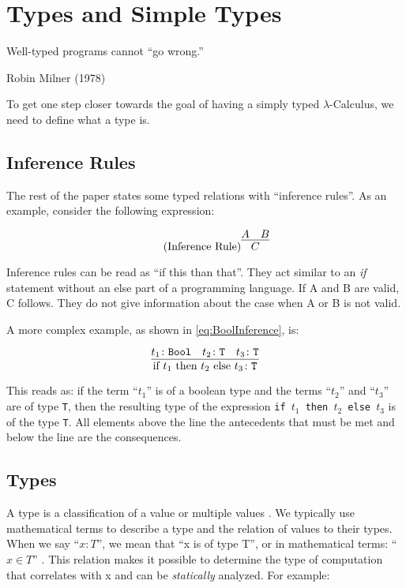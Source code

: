 \section{Types and Simple Types}

\epigraph{Well-typed programs cannot ``go wrong.''}{Robin Milner (1978)}

To get one step closer towards the goal of having a
simply typed $\lambda$-Calculus, we need to define
what a type is.

\subsection{Inference Rules}

The rest of the paper states some typed relations with
``inference rules''. As an example, consider the following
expression:

\begin{equation*}
    \tag{Inference Rule}
    \infer{
        C
    }{
        A & B
    }
\end{equation*}

Inference rules can be read as ``if this than that''. They act
similar to an \textit{if} statement without an else part of a programming language.
If A and B are valid, C follows. They do not give information about the
case when A or B is not valid.

A more complex example, as shown in \cref{eq:BoolInference}, is:

\begin{equation*}
    \infer{
        \text{if } t_1 \text{ then } t_2 \text{ else } t_3 \colon \texttt{T}
    }{
        t_1 \colon \texttt{Bool} & t_2 \colon \texttt{T} & t_3 \colon \texttt{T}
    }
\end{equation*}

This reads as: if the term ``$t_1$'' is of a boolean type and the terms ``$t_2$''
and ``$t_3$'' are of type \texttt{T},
then the resulting type of the expression \texttt{if $t_1$ then $t_2$ else $t_3$} is
of the type \texttt{T}. All elements above the line the antecedents that must be met
and below the line are the consequences.

\subsection{Types}

A type is a classification of a value or multiple values \cite{pierce2002ProgLang}.
We typically use mathematical terms to describe a type and the relation
of values to their types. When we say ``$x : T$'', we mean that
``x is of type T'', or in mathematical terms: ``$x \in T$'' \cite{pierce2002ProgLang}.
This relation makes it possible to determine the type of computation
that correlates with x and can be \textit{statically} analyzed.
For example:

